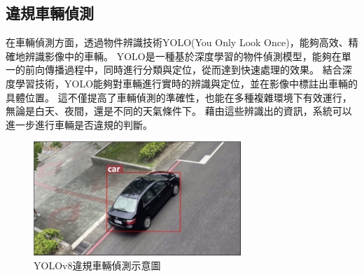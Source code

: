 \documentclass[12pt]{article}       %
\begin{document}
\subsection{違規車輛偵測}
\hspace{2em}在車輛偵測方面，透過物件辨識技術YOLO(You Only Look Once)，能夠高效、精確地辨識影像中的車輛。
YOLO是一種基於深度學習的物件偵測模型，能夠在單一的前向傳播過程中，同時進行分類與定位，從而達到快速處理的效果。
結合深度學習技術，YOLO能夠對車輛進行實時的辨識與定位，並在影像中標註出車輛的具體位置。
這不僅提高了車輛偵測的準確性，也能在多種複雜環境下有效運行，無論是白天、夜間，還是不同的天氣條件下。
藉由這些辨識出的資訊，系統可以進一步進行車輛是否違規的判斷。
\begin{figure}[H]
    \centering
    \includegraphics[width=0.7\textwidth]{yolov7car.jpg}     %
    \caption{YOLOv8違規車輛偵測示意圖}    %
    \label{fig:yolov7car}    %
\end{figure}
\end{document}
